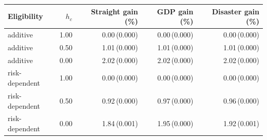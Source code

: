 \begin{tabular}{@{}lrrrr@{}}
\toprule
Eligibility & $h_c$ & Straight gain (\%) & GDP gain (\%) & Disaster gain (\%) \\ \midrule
additive & 1.00 & 0.00\,(0.000) & 0.00\,(0.000) & 0.00\,(0.000) \\
additive & 0.50 & 1.01\,(0.000) & 1.01\,(0.000) & 1.01\,(0.000) \\
additive & 0.00 & 2.02\,(0.000) & 2.02\,(0.000) & 2.02\,(0.000) \\
risk-dependent & 1.00 & 0.00\,(0.000) & 0.00\,(0.000) & 0.00\,(0.000) \\
risk-dependent & 0.50 & 0.92\,(0.000) & 0.97\,(0.000) & 0.96\,(0.000) \\
risk-dependent & 0.00 & 1.84\,(0.001) & 1.95\,(0.000) & 1.92\,(0.001) \\
\bottomrule
\end{tabular}
